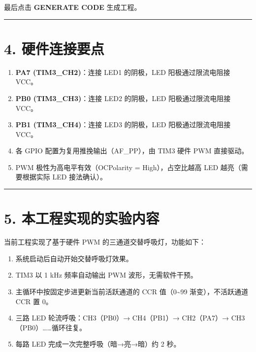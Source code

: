 \documentclass[
  chinese,
  UTF8,
  oneside,
  openany]{ctexbook}
\providecommand{\tightlist}{%
  \setlength{\itemsep}{0pt}\setlength{\parskip}{0pt}}
\begin{document}
最后点击 \textbf{GENERATE CODE} 生成工程。

\begin{center}\rule{0.5\linewidth}{0.5pt}\end{center}

\section{4. 硬件连接要点}\label{ux786cux4ef6ux8fdeux63a5ux8981ux70b9-4}

\begin{enumerate}
\def\labelenumi{\arabic{enumi}.}
\tightlist
\item
  \textbf{PA7 (TIM3\_CH2)}：连接 LED1 的阴极，LED 阳极通过限流电阻接
  VCC。
\item
  \textbf{PB0 (TIM3\_CH3)}：连接 LED2 的阴极，LED 阳极通过限流电阻接
  VCC。
\item
  \textbf{PB1 (TIM3\_CH4)}：连接 LED3 的阴极，LED 阳极通过限流电阻接
  VCC。
\item
  各 GPIO 配置为复用推挽输出（AF\_PP），由 TIM3 硬件 PWM 直接驱动。
\item
  PWM 极性为高电平有效（OCPolarity = High），占空比越高 LED
  越亮（需要根据实际 LED 接法确认）。
\end{enumerate}

\begin{center}\rule{0.5\linewidth}{0.5pt}\end{center}

\section{5.
本工程实现的实验内容}\label{ux672cux5de5ux7a0bux5b9eux73b0ux7684ux5b9eux9a8cux5185ux5bb9-2}

当前工程实现了基于硬件 PWM 的三通道交替呼吸灯，功能如下：

\begin{enumerate}
\def\labelenumi{\arabic{enumi}.}
\tightlist
\item
  系统启动后自动开始交替呼吸灯效果。
\item
  TIM3 以 1 kHz 频率自动输出 PWM 波形，无需软件干预。
\item
  主循环中按固定步进更新当前活跃通道的 CCR 值（0\textasciitilde99
  渐变），不活跃通道 CCR 置 0。
\item
  三路 LED 轮流呼吸：CH3（PB0）→ CH4（PB1）→ CH2（PA7）→
  CH3（PB0）\ldots\ldots 循环往复。
\item
  每路 LED 完成一次完整呼吸（暗→亮→暗）约 2 秒。
\end{enumerate}
\end{document}
